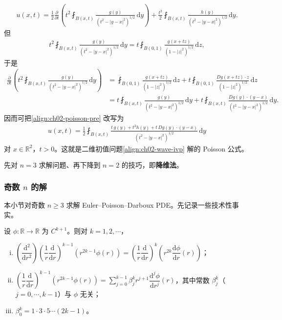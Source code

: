 \documentclass[../../main.tex]{subfiles}
\begin{document}
\begin{align}\label{align:ch02-poisson-pre}
u(x,t)=\frac{1}{2}\frac{\partial}{\partial t}\left(t^2\fint_{B(x,t)}\frac{g(y)}{(t^2-|y-x|^2)^{1/2}}\,\mathrm{d}y\right)
+\frac{t^2}{2}\fint_{B(x,t)}\frac{h(y)}{(t^2-|y-x|^2)^{1/2}}\,\mathrm{d}y.
\end{align}
但
\begin{align*}
t^2\fint_{B(x,t)}\frac{g(y)}{(t^2-|y-x|^2)^{1/2}}\,\mathrm{d}y
=t\fint_{B(0,1)}\frac{g(x+tz)}{(1-|z|^2)^{1/2}}\,\mathrm{d}z,
\end{align*}
于是
\begin{align*}
\frac{\partial}{\partial t}\left(t^2\fint_{B(x,t)}\frac{g(y)}{(t^2-|y-x|^2)^{1/2}}\,\mathrm{d}y\right)
&=\fint_{B(0,1)}\frac{g(x+tz)}{(1-|z|^2)^{1/2}}\,\mathrm{d}z
+t\fint_{B(0,1)}\frac{Dg(x+tz)\cdot z}{(1-|z|^2)^{1/2}}\,\mathrm{d}z\\
&=t\fint_{B(x,t)}\frac{g(y)}{(t^2-|y-x|^2)^{1/2}}\,\mathrm{d}y
+t\fint_{B(x,t)}\frac{Dg(y)\cdot(y-x)}{(t^2-|y-x|^2)^{1/2}}\,\mathrm{d}y.
\end{align*}
因而可把\eqref{align:ch02-poisson-pre} 改写为
\begin{align}\label{align:ch02-poisson-wave}
u(x,t)=\frac{1}{2}\fint_{B(x,t)}\frac{t\,g(y)+t^2h(y)+t\,Dg(y)\cdot(y-x)}{(t^2-|y-x|^2)^{1/2}}\,\mathrm{d}y
\end{align}
对 $x\in\mathbb{R}^2$，$t>0$。这就是二维初值问题\eqref{align:ch02-wave-ivp} 解的 Poisson 公式。

先对 $n=3$ 求解问题、再下降到 $n=2$ 的技巧，即\textbf{降维法}。

\subsubsection{奇数 $n$ 的解}

本小节对奇数 $n\geqslant 3$ 求解 Euler--Poisson--Darboux PDE。先记录一些技术性事实。

\begin{lemma}[一些有用的恒等式]\label{lemma:ch02-wave-identities}设 $\phi:\mathbb{R}\to\mathbb{R}$ 为 $C^{k+1}$。则对 $k=1,2,\cdots$，
\begin{enumerate}[(i)]
\item $\left(\dfrac{\mathrm{d}^2}{\mathrm{d}r^2}\right)\left(\dfrac{1}{r}\dfrac{\mathrm{d}}{\mathrm{d}r}\right)^{k-1}(r^{2k-1}\phi(r))=\left(\dfrac{1}{r}\dfrac{\mathrm{d}}{\mathrm{d}r}\right)^k\left(r^{2k}\dfrac{\mathrm{d}\phi}{\mathrm{d}r}(r)\right)$；
\item $\left(\dfrac{1}{r}\dfrac{\mathrm{d}}{\mathrm{d}r}\right)^{k-1}(r^{2k-1}\phi(r))=\sum_{j=0}^{k-1}\beta_j^k r^{j+1}\dfrac{\mathrm{d}^j\phi}{\mathrm{d}r^j}(r)$，其中常数 $\beta_j^k$（$j=0,\cdots,k-1$）与 $\phi$ 无关；
\item $\beta_0^k=1\cdot 3\cdot 5\cdots(2k-1)$。
\end{enumerate}
\end{lemma}
\end{document}
